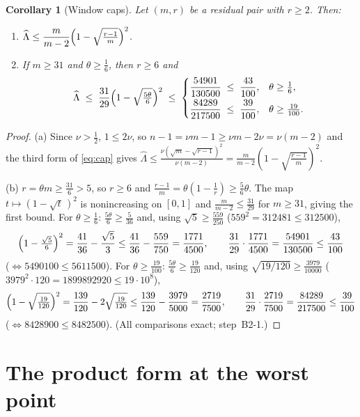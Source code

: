 \documentclass[11pt]{amsart}
\newtheorem{corollary}[theorem]{Corollary}
\theoremstyle{remark}
\newcommand{\Lhat}{\widehat\Lambda}
\begin{document}
\begin{corollary}[Window caps]\label{cor:capwindows}
Let $(m,r)$ be a residual pair with $r\ge2$.  Then:
\begin{enumerate}[label=\textup{(\alph*)}]
\item $\Lhat\le\dfrac{m}{m-2}\Bigl(1-\sqrt{\tfrac{r-1}{m}}\Bigr)^{2}$.
\item If $m\ge31$ and $\theta\ge\tfrac16$, then $r\ge6$ and
\[
        \Lhat\;\le\;\frac{31}{29}\Bigl(1-\sqrt{\tfrac{5\theta}6}\Bigr)^{2}
        \;\le\;
        \begin{cases}
        \dfrac{54901}{130500}\;\le\;\dfrac{43}{100}, & \theta\ge\tfrac16,\\[2mm]
        \dfrac{84289}{217500}\;\le\;\dfrac{39}{100}, & \theta\ge\tfrac{19}{100}.
        \end{cases}
\]
\end{enumerate}
\end{corollary}

\begin{proof}
(a) Since $\nu>\tfrac12$, $1\le2\nu$, so $n-1=\nu m-1\ge\nu m-2\nu=\nu(m-2)$ and the third form of \eqref{eq:cap} gives
$\Lhat\le\frac{\nu(\sqrt m-\sqrt{r-1})^2}{\nu(m-2)}=\frac{m}{m-2}(1-\sqrt{\tfrac{r-1}m})^2$.

(b) $r=\theta m\ge\tfrac{31}6>5$, so $r\ge6$ and $\frac{r-1}m=\theta(1-\tfrac1r)\ge\tfrac56\theta$.  The map $t\mapsto(1-\sqrt t\,)^2$ is nonincreasing on $[0,1]$ and $\tfrac m{m-2}\le\tfrac{31}{29}$ for $m\ge31$, giving the first bound.  For $\theta\ge\tfrac16$: $\tfrac{5\theta}6\ge\tfrac5{36}$ and, using $\sqrt5\ge\tfrac{559}{250}$ ($559^2=312481\le312500$),
\[
        \Bigl(1-\tfrac{\sqrt5}6\Bigr)^2=\frac{41}{36}-\frac{\sqrt5}{3}
        \le\frac{41}{36}-\frac{559}{750}=\frac{1771}{4500},
        \qquad
        \frac{31}{29}\cdot\frac{1771}{4500}=\frac{54901}{130500}
        \le\frac{43}{100}
\]
($\iff5490100\le5611500$).  For $\theta\ge\tfrac{19}{100}$: $\tfrac{5\theta}6\ge\tfrac{19}{120}$ and, using $\sqrt{19/120}\ge\tfrac{3979}{10000}$ ($3979^2\cdot120=1899892920\le19\cdot10^8$),
\[
        \Bigl(1-\sqrt{\tfrac{19}{120}}\Bigr)^2
        =\frac{139}{120}-2\sqrt{\tfrac{19}{120}}
        \le\frac{139}{120}-\frac{3979}{5000}=\frac{2719}{7500},
        \qquad
        \frac{31}{29}\cdot\frac{2719}{7500}=\frac{84289}{217500}
        \le\frac{39}{100}
\]
($\iff8428900\le8482500$).  (All comparisons exact; step~B2-1.)
\end{proof}

\section{The product form at the worst point}\label{sec:prod}
\end{document}
